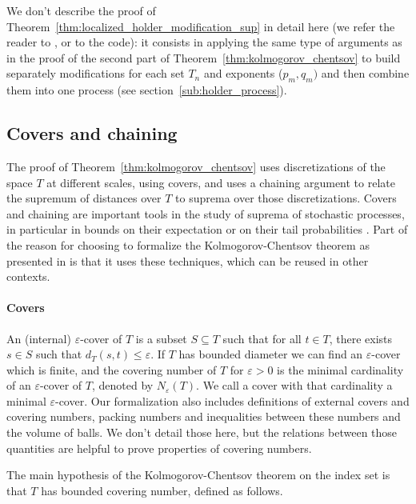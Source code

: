 \documentclass[lean]{Draft}
\begin{document}
We don't describe the proof of Theorem~\ref{thm:localized_holder_modification_sup} in detail here (we refer the reader to \cite{kratschmer2023kolmogorov}, or to the code): it consists in applying the same type of arguments as in the proof of the second part of Theorem~\ref{thm:kolmogorov_chentsov} to build separately modifications for each set $T_n$ and exponents ($p_m, q_m)$ and then combine them into one process (see section~\ref{sub:holder_process}).



\subsection{Covers and chaining}

The proof of Theorem~\ref{thm:kolmogorov_chentsov} uses discretizations of the space $T$ at different scales, using covers, and uses a chaining argument to relate the supremum of distances over $T$ to suprema over those discretizations.
Covers and chaining are important tools in the study of suprema of stochastic processes, in particular in bounds on their expectation or on their tail probabilities \cite{talagrand2022upper, vershynin2018high}.
Part of the reason for choosing to formalize the Kolmogorov-Chentsov theorem as presented in \cite{kratschmer2023kolmogorov} is that it uses these techniques, which can be reused in other contexts.


\paragraph{Covers}

An (internal) $\varepsilon$-cover of $T$ is a subset $S \subseteq T$ such that for all $t \in T$, there exists $s \in S$ such that $d_T(s, t) \le \varepsilon$.
If $T$ has bounded diameter we can find an $\varepsilon$-cover which is finite, and the covering number of $T$ for $\varepsilon > 0$ is the minimal cardinality of an $\varepsilon$-cover of $T$, denoted by $N_\varepsilon(T)$.
We call a cover with that cardinality a minimal $\varepsilon$-cover.
Our formalization also includes definitions of external covers and covering numbers, packing numbers and inequalities between these numbers and the volume of balls. We don't detail those here, but the relations between those quantities are helpful to prove properties of covering numbers.

The main hypothesis of the Kolmogorov-Chentsov theorem on the index set is that $T$ has bounded covering number, defined as follows.
\end{document}
